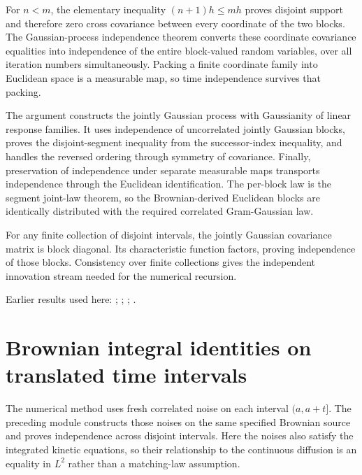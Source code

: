 \documentclass[11pt,a4paper]{report}
\begin{document}
For \(n<m\), the elementary inequality \((n+1)h\le mh\) proves disjoint support and therefore zero cross covariance between every coordinate of the two blocks. The Gaussian-process independence theorem converts these coordinate covariance equalities into independence of the entire block-valued random variables, over all iteration numbers simultaneously. Packing a finite coordinate family into Euclidean space is a measurable map, so time independence survives that packing.



The argument constructs the jointly Gaussian process with Gaussianity of linear response families. It uses independence of uncorrelated jointly Gaussian blocks, proves the disjoint-segment inequality from the successor-index inequality, and handles the reversed ordering through symmetry of covariance. Finally, preservation of independence under separate measurable maps transports independence through the Euclidean identification. The per-block law is the segment joint-law theorem, so the Brownian-derived Euclidean blocks are identically distributed with the required correlated Gram-Gaussian law.



For any finite collection of disjoint intervals, the jointly Gaussian covariance matrix is block diagonal. Its characteristic function factors, proving independence of those blocks. Consistency over finite collections gives the independent innovation stream needed for the numerical recursion.



Earlier results used here: \cite[Section~3.6.12]{LangevinLean2026ULASC}; \cite[Section~3.6.25]{LangevinLean2026ULASC}; \cite[Section~3.7.2]{LangevinLean2026ULASC}; \cite[Section~3.8.5]{LangevinLean2026ULASC}.
\section{\texorpdfstring{Brownian integral identities on translated time intervals}{Brownian integral identities on translated time intervals}}
\label{proof-module-KineticLangevin-BrownianSegmentEquations-lean}


The numerical method uses fresh correlated noise on each interval \((a,a+t]\). The preceding module constructs those noises on the same specified Brownian source and proves independence across disjoint intervals. Here the noises also satisfy the integrated kinetic equations, so their relationship to the continuous diffusion is an equality in \(L^{2}\) rather than a matching-law assumption.
\end{document}
